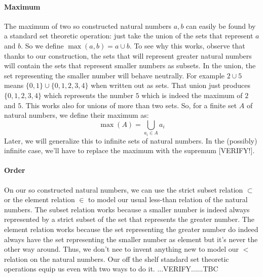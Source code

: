\paragraph{Maximum}
The maximum of two so constructed natural numbers $a,b$ can easily be found by a standard set theoretic operation: just take the union of the sets that represent $a$ and $b$. So we define $\max(a,b) = a \cup b$. To see why this works, observe that thanks to our construction, the sets that will represent greater natural numbers will contain the sets that represent smaller numbers as subsets. In the union, the set representing the smaller number will behave neutrally. For example $2 \cup 5$ means $\{0,1\} \cup \{0,1,2,3,4\}$ when written out as sets. That union just produces $\{0,1,2,3,4\}$ which represents the number $5$ which is indeed the maximum of $2$ and $5$. This works also for unions of more than two sets. So, for a finite set $A$ of natural numbers, we define their maximum as:
\begin{equation}
\max(A) = \bigcup_{a_i \in A} a_i
\end{equation}
Later, we will generalize this to infinite sets of natural numbers. In the (possibly) infinite case, we'll have to replace the maximum with the supremum [VERIFY!].

\paragraph{Order}
On our so constructed natural numbers, we can use the strict subset relation $\subset$ or the element relation $\in$ to model our usual less-than relation of the natural numbers. The subset relation works because a smaller number is indeed always represented by a strict subset of the set that represents the greater number. The element relation works because the set representing the greater number do indeed always have the set representing the smaller number as element but it's never the other way around. Thus, we don't nee to invent anything new to model our $<$ relation on the natural numbers. Our off the shelf standard set theoretic operations equip us even with two ways to do it. ...VERIFY......TBC



